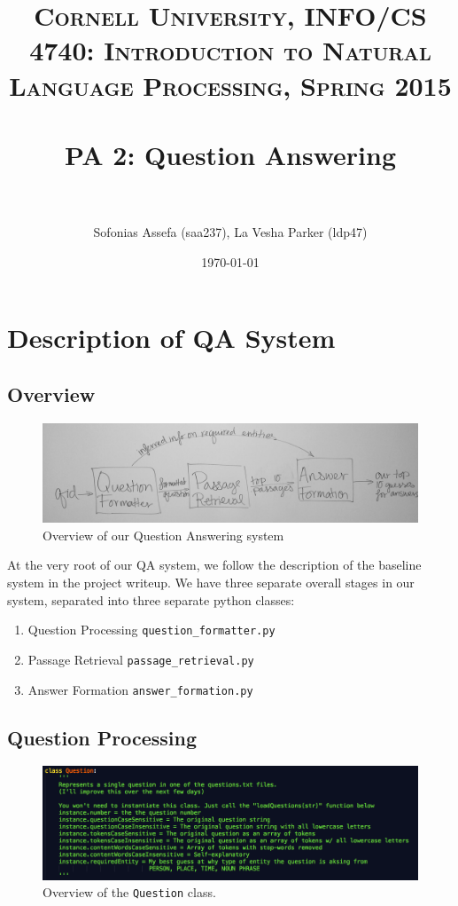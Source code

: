 \documentclass{article}
\title{	
\normalfont \normalsize 
\textsc{Cornell University, INFO/CS 4740: Introduction to Natural Language Processing, Spring 2015} \\
\horrule{0.5pt} \\[0.4cm]
\huge PA 2: Question Answering \\ 
\horrule{2pt} \\[0.5cm]
}
\author{Sofonias Assefa (saa237), La Vesha Parker (ldp47)}
\date{\normalsize\today}
\begin{document}
\maketitle

\section{Description of QA System}
\subsection*{Overview}
\begin{figure}[h]
    \centering
    \includegraphics[width=1.0\textwidth]{images/diagram.jpg}
    \caption{Overview of our Question Answering system}
\end{figure}
At the very root of our QA system, we follow the description of the baseline system in the project writeup. We have three separate overall stages in our system, separated into three separate python classes:
\begin{enumerate}
\item Question Processing \texttt{question\_formatter.py}
\item Passage Retrieval \texttt{passage\_retrieval.py}
\item Answer Formation \texttt{answer\_formation.py}
\end{enumerate}

\subsection{Question Processing}
\begin{figure}[h]
    \centering
    \includegraphics[width=1.0\textwidth]{images/question.png}
    \caption{Overview of the \texttt{Question} class.}
\end{figure}
\end{document}
